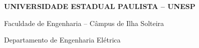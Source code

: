 \documentclass[12pt, a4paper, openright, oneside, chapter=TITLE, brazilian]{abntex2}
\begin{document}
\hypersetup{pageanchor=false}

\begin{capa}
    \centering
    {\normalfont\bfseries\MakeUppercase{Universidade Estadual Paulista -- UNESP}\par}
    {Faculdade de Engenharia -- Câmpus de Ilha Solteira\par}
    {Departamento de Engenharia Elétrica\par}
    \vspace*{3cm}
    {\normalfont\bfseries\MakeUppercase{\imprimirautor}}
    \vfill
    \begin{center}
    {\normalfont\bfseries\MakeUppercase{\imprimirtitulo}}
    \end{center}
    \vfill
    {\imprimirlocal}
    \par
    {\imprimirdata}
    \vspace*{1cm}
\end{capa}

\imprimirfolhaderosto*
\end{document}
